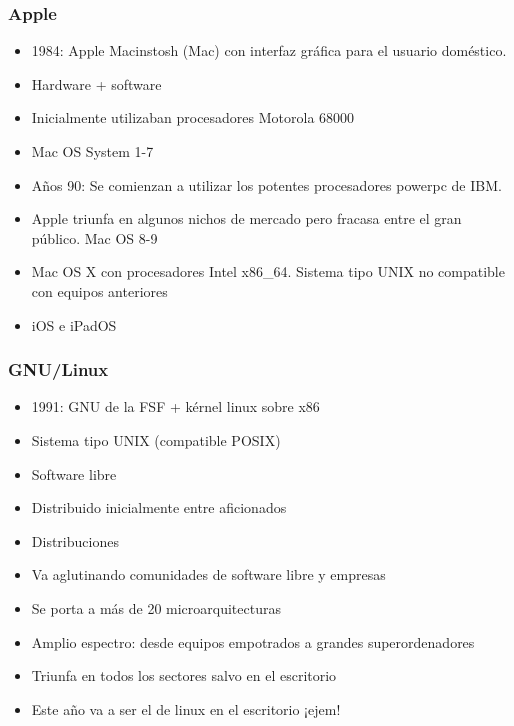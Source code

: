 \documentclass{beamer}
\begin{document}
\begin{frame}
  \frametitle{Apple}
    \begin{itemize}
    \item 1984: Apple Macinstosh (Mac) con interfaz gráfica para el usuario
      doméstico.
    \item Hardware + software
    \item Inicialmente utilizaban procesadores Motorola 68000
    \item Mac OS System 1-7
    \item Años 90: Se comienzan a utilizar los potentes procesadores powerpc de
      IBM.
    \item Apple triunfa en algunos nichos de mercado pero fracasa entre el gran
      público. Mac OS 8-9
    \item Mac OS X con procesadores Intel x86\_64. Sistema tipo UNIX no compatible
      con equipos anteriores
    \item iOS e iPadOS
    \end{itemize}
\end{frame}

\begin{frame}
  \frametitle{GNU/Linux}
  \begin{itemize}
  \item 1991: GNU de la FSF + kérnel linux sobre x86
  \item Sistema tipo UNIX (compatible POSIX)
  \item Software libre
  \item Distribuido inicialmente entre aficionados
  \item Distribuciones
  \item Va aglutinando comunidades de software libre y empresas
  \item Se porta a más de 20 microarquitecturas
  \item Amplio espectro: desde equipos empotrados a grandes superordenadores
  \item Triunfa en todos los sectores salvo en el escritorio
  \item Este año va a ser el de linux en el escritorio ¡ejem!    
  \end{itemize}
\end{frame}
\end{document}
